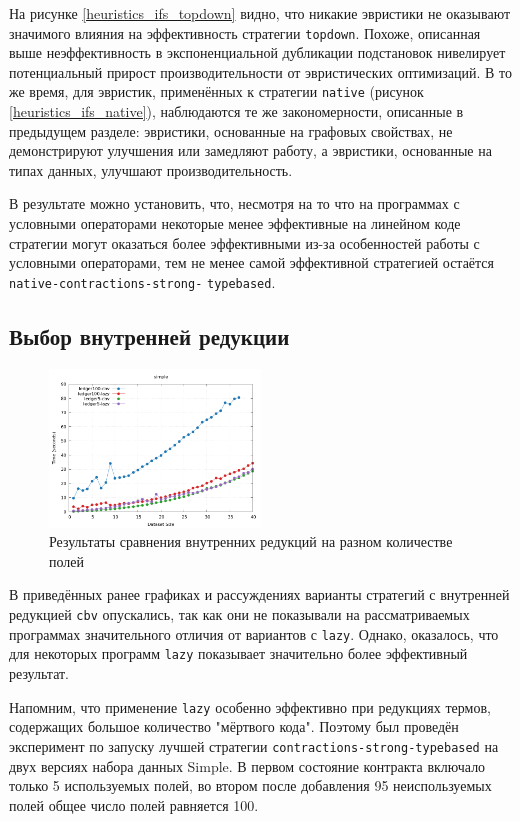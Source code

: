 \documentclass[../thesis.tex]{subfiles}
\begin{document}
На рисунке \ref{heuristics_ifs_topdown} видно, что никакие эвристики не оказывают значимого влияния на эффективность стратегии \texttt{topdown}. Похоже, описанная выше неэффективность в экспоненциальной дубликации подстановок нивелирует потенциальный прирост производительности от эвристических оптимизаций. В то же время, для эвристик, применённых к стратегии \texttt{native} (рисунок \ref{heuristics_ifs_native}), наблюдаются те же закономерности, описанные в предыдущем разделе: эвристики, основанные на графовых свойствах, не демонстрируют улучшения или замедляют работу, а эвристики, основанные на типах данных, улучшают производительность.

В результате можно установить, что, несмотря на то что на программах с условными операторами некоторые менее эффективные на линейном коде стратегии могут оказаться более эффективными из-за особенностей работы с условными операторами, тем не менее самой эффективной стратегией остаётся \texttt{native-contractions-strong-} \texttt{typebased}.

\subsection{Выбор внутренней редукции}\label{lazy_best}

\begin{figure}
    \centering
    \includegraphics[width=0.5\textwidth]{ledger_size.png} 
    \caption{Результаты сравнения внутренних редукций на разном количестве полей}
    \label{ledger_size}
\end{figure}

В приведённых ранее графиках и рассуждениях варианты стратегий с внутренней редукцией \texttt{cbv} опускались, так как они не показывали на рассматриваемых программах значительного отличия от вариантов с \texttt{lazy}. Однако, оказалось, что для некоторых программ \texttt{lazy} показывает значительно более эффективный результат.

Напомним, что применение \texttt{lazy} особенно эффективно при редукциях термов, содержащих большое количество "мёртвого кода". Поэтому был проведён эксперимент по запуску лучшей стратегии \texttt{contractions-strong-typebased} на двух версиях набора данных Simple. В первом состояние контракта включало только 5 используемых полей, во втором после добавления 95 неиспользуемых полей общее число полей равняется 100. 
\end{document}
